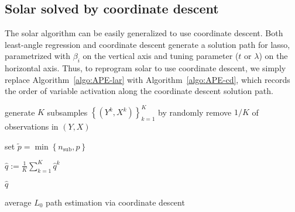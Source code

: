 \documentclass[12pt]{article}
\begin{document}
\subsection{Solar solved by coordinate descent}

The solar algorithm can be easily generalized to use coordinate descent. Both least-angle regression and coordinate descent generate a solution path for lasso, parametrized with $\beta_i$ on the vertical axis and tuning parameter ($t$ or $\lambda$) on the horizontal axis. Thus, to reprogram solar to use coordinate descent, we simply replace Algorithm~\ref{algo:APE-lar} with Algorithm~\ref{algo:APE-cd}, which records the order of variable activation along the coordinate descent solution path.

\smallskip
\begin{algorithm}[h]


  \smallskip

  generate $K$ subsamples $\left\{ \left( Y^k, X^k \right) \right\}^{K}_{k=1}$ by randomly remove $1/K$ of observations in $\left( Y, X \right)$\;

  set $\widetilde{p} = \min\left\{ n_{\mathrm{sub}}, p \right\}$ \;


  $\widehat{q} := \frac{1}{K} \sum_{k=1}^{K} \widehat{q}^k$\; 

  \Return $\widehat{q}$

\caption{average $L_0$ path estimation via coordinate descent \label{algo:APE-cd}}

\end{algorithm}
\end{document}
